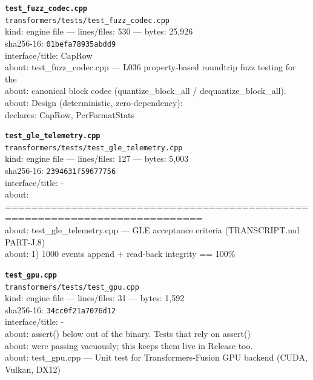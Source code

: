 \noindent\textbf{\texttt{test\_fuzz\_codec.cpp}}\\
\texttt{transformers/tests/test\_fuzz\_codec.cpp}\\
kind: engine file --- lines/files: 530 --- bytes: 25,926\\
sha256-16: \texttt{01befa78935abdd9}\\
interface/title: CapRow\\
about: test\_fuzz\_codec.cpp — L036 property-based roundtrip fuzz testing for the\\
about: canonical block codec (quantize\_block\_all / dequantize\_block\_all).\\
about: Design (deterministic, zero-dependency):\\
declares: CapRow, PerFormatStats\\
\vspace*{6.0pt}

\noindent\textbf{\texttt{test\_gle\_telemetry.cpp}}\\
\texttt{transformers/tests/test\_gle\_telemetry.cpp}\\
kind: engine file --- lines/files: 127 --- bytes: 5,003\\
sha256-16: \texttt{2394631f59677756}\\
interface/title: -\\
about: ============================================================================\\
about: test\_gle\_telemetry.cpp — GLE acceptance criteria (TRANSCRIPT.md PART-J.8)\\
about: 1) 1000 events append + read-back integrity == 100\%\\
\vspace*{6.0pt}
\newpage

\noindent\textbf{\texttt{test\_gpu.cpp}}\\
\texttt{transformers/tests/test\_gpu.cpp}\\
kind: engine file --- lines/files: 31 --- bytes: 1,592\\
sha256-16: \texttt{34cc0f21a7076d12}\\
interface/title: -\\
about: assert() below out of the binary. Tests that rely on assert()\\
about: were passing vacuously; this keeps them live in Release too.\\
about: test\_gpu.cpp — Unit test for Transformers-Fusion GPU backend (CUDA, Vulkan, DX12)\\
\vspace*{6.0pt}

